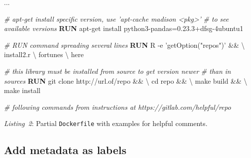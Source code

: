 \documentclass[10pt,letterpaper]{article}
\newenvironment{Shaded}{\begin{snugshade}}{\end{snugshade}}
\newcommand{\CommentTok}[1]{\textcolor[rgb]{0.56,0.35,0.01}{\textit{#1}}}
\newcommand{\KeywordTok}[1]{\textcolor[rgb]{0.13,0.29,0.53}{\textbf{#1}}}
\newcommand{\NormalTok}[1]{#1}
\newcommand{\StringTok}[1]{\textcolor[rgb]{0.31,0.60,0.02}{#1}}
\begin{document}
\begin{Shaded}
\begin{Highlighting}[]
\NormalTok{...}

\CommentTok{# apt-get install specific version, use 'apt-cache madison <pkg>' }
\CommentTok{# to see available versions}
\KeywordTok{RUN}\NormalTok{ apt-get install python3-pandas=0.23.3+dfsg-4ubuntu1}

\CommentTok{# RUN command spreading several lines}
\KeywordTok{RUN}\NormalTok{ R -e }\StringTok{'getOption("repos")'}\NormalTok{ && \textbackslash{}}
\NormalTok{  install2.r \textbackslash{}}
\NormalTok{    fortunes \textbackslash{}}
\NormalTok{    here}

\CommentTok{# this library must be installed from source to get version newer}
\CommentTok{# than in sources}
\KeywordTok{RUN}\NormalTok{ git clone http://url.of/repo && \textbackslash{}}
\NormalTok{  cd repo && \textbackslash{}}
\NormalTok{  make build && \textbackslash{}}
\NormalTok{  make install}

\CommentTok{# following commands from instructions at https://gitlab.com/helpful/repo}
\end{Highlighting}
\end{Shaded}

\normalsize

\emph{Listing~2}: Partial \texttt{Dockerfile} with examples for helpful
comments.

\hypertarget{add-metadata-as-labels}{%
\subsection{Add metadata as labels}\label{add-metadata-as-labels}}
\end{document}
